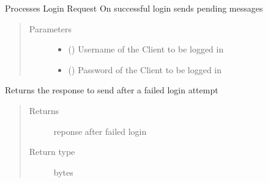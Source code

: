 \documentclass[letterpaper,10pt,english]{sphinxmanual}
\begin{document}
\begin{fulllineitems}
\begin{fulllineitems}
\begin{quote}
\begin{description}
\end{description}\end{quote}

\end{fulllineitems}


\begin{fulllineitems}
\label{\detokenize{Message:Message.Message._process_login}}
Processes Login Request
On successful login sends pending messages
\begin{quote}\begin{description}
\item[{Parameters}] \leavevmode\begin{itemize}
\item {} 
 () \textendash{} Username of the Client to be logged in

\item {} 
 () \textendash{} Password of the Client to be logged in

\end{itemize}

\end{description}\end{quote}

\end{fulllineitems}


\begin{fulllineitems}
\label{\detokenize{Message:Message.Message._login_failed}}
Returns the response to send after a failed login attempt
\begin{quote}\begin{description}
\item[{Returns}] \leavevmode
reponse after failed login

\item[{Return type}] \leavevmode
bytes


\end{description}
\end{quote}
\end{fulllineitems}
\end{fulllineitems}
\end{document}
